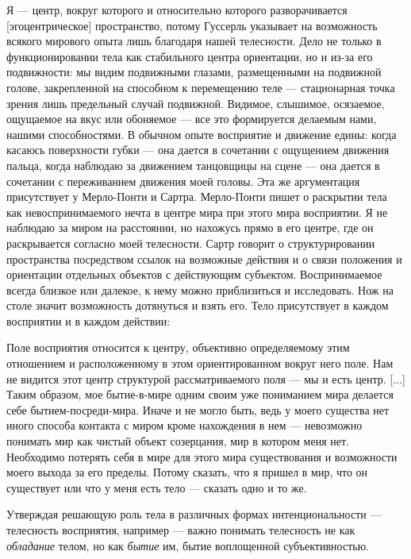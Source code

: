 \documentclass[11pt]{book}
\begin{document}
Я --- центр, вокруг которого и относительно которого разворачивается [эгоцентрическое] пространство, потому Гуссерль указывает на возможность всякого мирового опыта лишь благодаря нашей телесности. Дело не только в функционировании тела как стабильного центра ориентации, но и из-за его подвижности: мы видим подвижными глазами, размещенными на подвижной голове, закрепленной на способном к перемещению теле --- стационарная точка зрения лишь предельный случай подвижной. Видимое, слышимое, осязаемое, ощущаемое на вкус или обоняемое --- все это формируется делаемым нами, нашими способностями. В обычном опыте восприятие и движение едины: когда касаюсь поверхности губки --- она дается в сочетании с ощущением движения пальца, когда наблюдаю за движением танцовщицы на сцене --- она дается в сочетании с переживанием движения моей головы. Эта же аргументация присутствует у Мерло-Понти и Сартра. Мерло-Понти пишет о раскрытии тела как невоспринимаемого нечта в центре мира при этого мира восприятии. Я не наблюдаю за миром на расстоянии, но нахожусь прямо в его центре, где он раскрывается согласно моей телесности. Сартр говорит о структурировании пространства посредством ссылок на возможные действия и о связи положения и ориентации отдельных объектов с действующим субъектом. Воспринимаемое всегда близкое или далекое, к нему можно приблизиться и исследовать. Нож на столе значит возможность дотянуться и взять его. Тело присутствует в каждом восприятии и в каждом действии:

\smallskip
{}\relax
{}\relax

Поле восприятия относится к центру, объективно определяемому этим отношением и расположенному в этом ориентированном вокруг него поле. Нам не видится этот центр структурой рассматриваемого поля --- мы и есть центр. [...] Таким образом, мое бытие-в-мире одним своим уже пониманием мира делается себе бытием-посреди-мира. Иначе и не могло быть, ведь у моего существа нет иного способа контакта с миром кроме нахождения в нем --- невозможно понимать мир как чистый объект созерцания, мир в котором меня нет. Необходимо потерять себя в мире для этого мира существования и возможности моего выхода за его пределы. Потому сказать, что я пришел в мир, что он существует или что у меня есть тело --- сказать одно и то же.

\relax
{}\relax
\smallskip

Утверждая решающую роль тела в различных формах интенциональности --- телесность восприятия, например --- важно понимать телесность не как \textit{обладание} телом, но как \textit{бытие} им, бытие воплощенной субъективностью.
\end{document}
